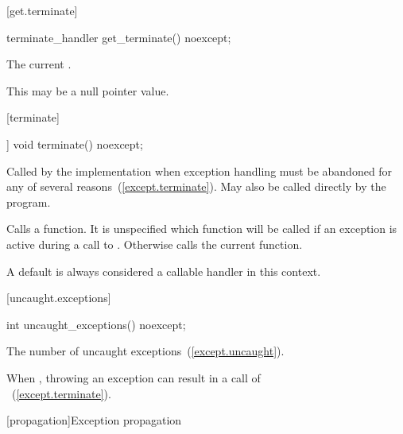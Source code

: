 [get.terminate]{}

\begin{itemdecl}
terminate_handler get_terminate() noexcept;
\end{itemdecl}

\begin{itemdescr}
\pnum
\returns The current .
\begin{note} This may be a null pointer value. \end{note}
\end{itemdescr}

[terminate]{}

%
\begin{itemdecl}
[[noreturn]] void terminate() noexcept;
\end{itemdecl}

\begin{itemdescr}
\pnum
\remarks
Called by the implementation when exception
handling must be abandoned for any of several reasons~(\ref{except.terminate}).
May also be called directly by the program.

\pnum
\effects
Calls a  function. It is unspecified which
 function will be called if an exception is active
during a call to .
Otherwise calls the current  function. \begin{note} A
default  is always considered a callable handler in
this context. \end{note}
\end{itemdescr}

[uncaught.exceptions]{}

%
\begin{itemdecl}
int uncaught_exceptions() noexcept;
\end{itemdecl}

\begin{itemdescr}
\pnum
\returns
The number of uncaught exceptions~(\ref{except.uncaught}).

\pnum
\remarks
When ,
throwing an exception can result in a call of\\
~(\ref{except.terminate}).
\end{itemdescr}

[propagation]{Exception propagation}

